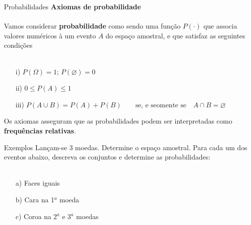 \documentclass[10pt]{beamer}\usepackage[]{graphicx}\usepackage[]{color}
\theoremstyle{definition}
\begin{document}
\begin{frame}[fragile]{Probabilidades}
  \textbf{Axiomas de probabilidade}\\~\\
  Vamos considerar \textbf{probabilidade} como sendo uma função
  $P(\cdot)$ que associa valores numéricos à um evento $A$ do espaço
  amostral, e que satisfaz as seguintes condições \\~\\
  \begin{itemize}
  \item[i)] $P(\Omega) = 1$; $P(\varnothing) = 0$
  \item[ii)] $0 \leq P(A) \leq 1$ %
  \item[iii)] $P(A \cup B) = P(A) + P(B) \quad\quad
    \text{se, e seomente se}\quad A \cap B = \varnothing$
  \end{itemize}
  \vspace{1em}
  Os axiomas asseguram que as probabilidades podem ser interpretadas
  como \textbf{frequências relativas}.
\end{frame}


\begin{frame}[fragile]{Exemplos}
  Lançam-se 3 moedas. Determine o espaço amostral. Para cada um dos
  eventos abaixo, descreva os conjuntos e determine as probabilidades: \\~\\
  \begin{itemize}
  \item[a)] Faces iguais
  \item[b)] Cara na 1$^a$ moeda
  \item[c)] Coroa na 2$^a$ e 3$^a$ moedas
  \end{itemize}
\end{frame}
\end{document}

